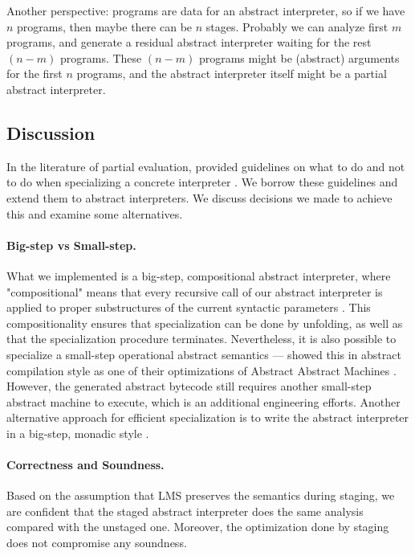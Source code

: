 Another perspective: programs are data for an abstract interpreter, so if we have $n$ programs, 
then maybe there can be $n$ stages. 
Probably we can analyze first $m$ programs, and generate a residual abstract interpreter
waiting for the rest $(n-m)$ programs.
These $(n-m)$ programs might be (abstract) arguments for the first $n$ programs, and
the abstract interpreter itself might be a partial abstract interpreter.

\subsection{Discussion}
In the literature of partial evaluation, \citeauthor{10.1007/3-540-61580-6_11} provided guidelines
on what to do and not to do when specializing a concrete interpreter \cite{10.1007/3-540-61580-6_11}. 
We borrow these guidelines and extend them to abstract interpreters. We discuss decisions we made to 
achieve this and examine some alternatives.

\paragraph{Big-step vs Small-step.}
What we implemented is a big-step, compositional  abstract interpreter, 
where "compositional" means that every recursive call of our abstract interpreter is applied to proper 
substructures of the current syntactic parameters \cite{10.1007/3-540-61580-6_11}.
This compositionality ensures that specialization can be done by unfolding,
as well as that the specialization procedure terminates.
Nevertheless, it is also possible to specialize a small-step operational abstract semantics ---
\citeauthor{Johnson:2013:OAA:2500365.2500604}
showed this in abstract compilation \cite{Boucher:1996:ACN:647473.727587} style as one of their optimizations
of Abstract Abstract Machines \cite{Johnson:2013:OAA:2500365.2500604}. 
However, the generated abstract bytecode still requires another small-step abstract machine 
to execute, which is an additional engineering efforts.
Another alternative approach for efficient specialization is to write the abstract interpreter 
in a big-step, monadic style \cite{DBLP:journals/pacmpl/DaraisLNH17}.


\paragraph{Correctness and Soundness.}
Based on the assumption that LMS preserves the semantics during staging,
we are confident that the staged abstract interpreter does the same analysis compared 
with the unstaged one. Moreover, the optimization done by staging does not compromise
any soundness.

